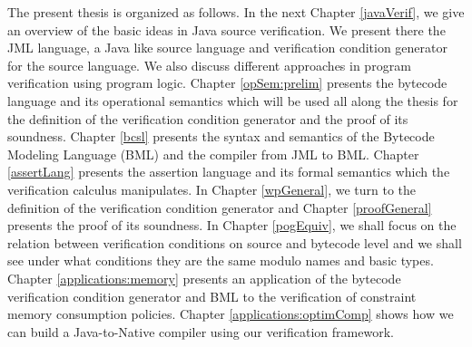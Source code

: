The present thesis is organized as follows. In the next Chapter \ref{javaVerif}, we give an overview of
the basic ideas in Java source verification. We present there the JML language, a Java like source language and verification condition generator
for the source language. We also discuss different approaches in program verification using program logic.
Chapter \ref{opSem:prelim} presents
 the bytecode language and its operational semantics which will be used all along the thesis for the definition of the verification condition generator and the proof
of its soundness. 
Chapter \ref{bcsl} presents the syntax and semantics of the Bytecode Modeling Language (BML) and the compiler from JML to BML. 
Chapter \ref{assertLang} presents the assertion language and its formal semantics which the verification calculus manipulates. 
In Chapter \ref{wpGeneral}, we turn to the definition of the verification condition generator and Chapter \ref{proofGeneral}
 presents the proof of its soundness. In Chapter \ref{pogEquiv}, we shall focus on the relation between 
verification conditions on source and bytecode level and we shall see under what conditions they are the same modulo names and basic types. 
Chapter \ref{applications:memory} presents an application of the bytecode verification condition generator and BML to the verification of constraint memory consumption
policies. Chapter \ref{applications:optimComp} shows how we can build a Java-to-Native compiler using our verification framework.




